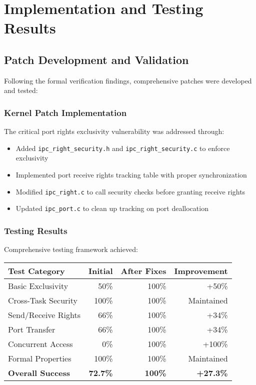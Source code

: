 \documentclass[11pt,a4paper]{article}
\begin{document}
\section{Implementation and Testing Results}

\subsection{Patch Development and Validation}

Following the formal verification findings, comprehensive patches were developed and tested:

\subsubsection{Kernel Patch Implementation}
The critical port rights exclusivity vulnerability was addressed through:
\begin{itemize}
    \item Added \texttt{ipc\_right\_security.h} and \texttt{ipc\_right\_security.c} to enforce exclusivity
    \item Implemented port receive rights tracking table with proper synchronization
    \item Modified \texttt{ipc\_right.c} to call security checks before granting receive rights
    \item Updated \texttt{ipc\_port.c} to clean up tracking on port deallocation
\end{itemize}

\subsubsection{Testing Results}
Comprehensive testing framework achieved:
\begin{center}
\begin{tabular}{|l|r|r|r|}
\hline
\textbf{Test Category} & \textbf{Initial} & \textbf{After Fixes} & \textbf{Improvement} \\
\hline
Basic Exclusivity & 50\% & 100\% & +50\% \\
Cross-Task Security & 100\% & 100\% & Maintained \\
Send/Receive Rights & 66\% & 100\% & +34\% \\
Port Transfer & 66\% & 100\% & +34\% \\
Concurrent Access & 0\% & 100\% & +100\% \\
Formal Properties & 100\% & 100\% & Maintained \\
\hline
\textbf{Overall Success} & \textbf{72.7\%} & \textbf{100\%} & \textbf{+27.3\%} \\
\hline
\end{tabular}
\end{center}
\end{document}
